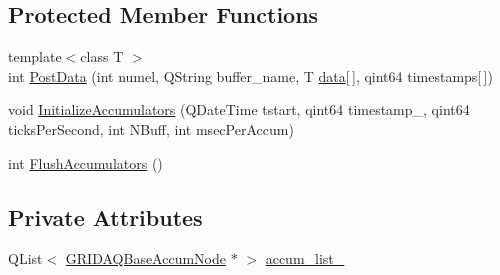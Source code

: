 \subsection*{\-Protected \-Member \-Functions}
\begin{DoxyCompactItemize}
\item 
{\footnotesize template$<$class T $>$ }\\int \hyperlink{classGRIDAQThread_a3b8409fdb2528ac1a3893482665aa82a}{\-Post\-Data} (int numel, \-Q\-String buffer\-\_\-name, \-T \hyperlink{structGRIProcessThread_1_1data}{data}\mbox{[}$\,$\mbox{]}, qint64 timestamps\mbox{[}$\,$\mbox{]})
\item 
void \hyperlink{classGRIDAQThread_ab319b29591302d1e2b356ce10e6e4345}{\-Initialize\-Accumulators} (\-Q\-Date\-Time tstart, qint64 timestamp\-\_, qint64 ticks\-Per\-Second, int \-N\-Buff, int msec\-Per\-Accum)
\item 
int \hyperlink{classGRIDAQThread_a124368a5c9f0d6990ab1fb09779b2ab0}{\-Flush\-Accumulators} ()
\end{DoxyCompactItemize}
\subsection*{\-Private \-Attributes}
\begin{DoxyCompactItemize}
\item 
\-Q\-List$<$ \hyperlink{classGRIDAQBaseAccumNode}{\-G\-R\-I\-D\-A\-Q\-Base\-Accum\-Node} $\ast$ $>$ \hyperlink{classGRIDAQThread_af28c48340ab936811b52febd9e171e45}{accum\-\_\-list\-\_\-}
\end{DoxyCompactItemize}


